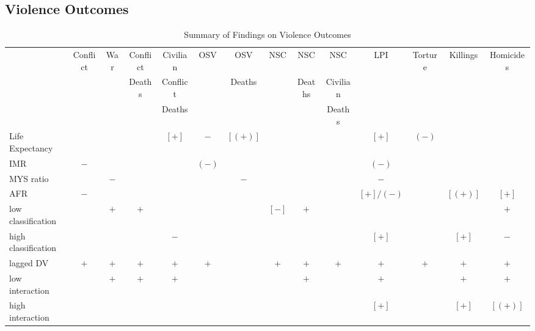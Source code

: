 \documentclass[12pt]{article}
\begin{document}
\subsection{Violence Outcomes}

\begin{table}
\small
\centering
\caption{Summary of Findings on Violence Outcomes}
\label{table_panel_violence}
\begin{tabular}{lc|c|c|c|c|c|c|c|c|c|c|c|c}

\toprule
                    & Conflict & War & Conflict & Civilian & OSV   & OSV     & NSC   & NSC    & NSC      & LPI       & Torture & Killings & Homicides \\
                    &          &     & Deaths   & Conflict &       & Deaths  &       & Deaths & Civilian &           &         &          & \\
                    &          &     &          & Deaths   &       &         &       &        & Deaths   &           &         &          & \\
\midrule
Life Expectancy     &          &     &          & $[+]$    & $-$   & $[(+)]$ &       &        &          & $[+]$     & $(-)$   &          & \\
IMR                 & $-$      &     &          &          & $(-)$ &         &       &        &          & $(-)$     &         &          & \\
MYS ratio           &          & $-$ &          &          &       & $-$     &       &        &          & $-$       &         &          & \\
AFR                 & $-$      &     &          &          &       &         &       &        &          & $[+]/(-)$ &         & $[(+)]$  & $[+]$ \\
low classification  &          & $+$ & $+$      &          &       &         & $[-]$ & $+$    &          &           &         &          & $+$ \\
high classification &          &     &          & $-$      &       &         &       &        &          & $[+]$     &         & $[+]$    & $-$ \\
lagged DV           & $+$      & $+$ & $+$      & $+$      & $+$   &         & $+$   & $+$    & $+$      & $+$       & $+$     & $+$      & $+$ \\
\qquad low interaction     &          & $+$ & $+$      & $+$      &       &         &       & $+$    &          & $+$       &         & $+$      & $+$ \\
\qquad high interaction    &          &     &          &          &       &         &       &        &          & $[+]$     &         & $[+]$    & $[(+)]$ \\
\bottomrule
\end{tabular}
\end{table}
\end{document}
